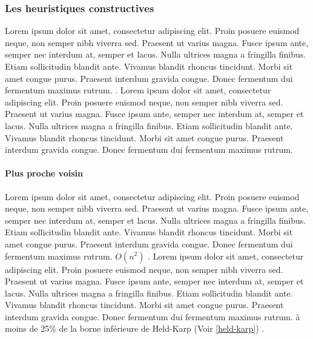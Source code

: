 \medskip

\subsubsection{Les heuristiques constructives}
Lorem ipsum dolor sit amet, consectetur adipiscing elit. Proin posuere euismod neque, non semper nibh viverra sed. Praesent ut varius magna. Fusce ipsum ante, semper nec interdum at, semper et lacus. Nulla ultrices magna a fringilla finibus. Etiam sollicitudin blandit ante. Vivamus blandit rhoncus tincidunt. Morbi sit amet congue purus. Praesent interdum gravida congue. Donec fermentum dui fermentum maximus rutrum. \parencite{anbuudayasankar_survey_2014}. Lorem ipsum dolor sit amet, consectetur adipiscing elit. Proin posuere euismod neque, non semper nibh viverra sed. Praesent ut varius magna. Fusce ipsum ante, semper nec interdum at, semper et lacus. Nulla ultrices magna a fringilla finibus. Etiam sollicitudin blandit ante. Vivamus blandit rhoncus tincidunt. Morbi sit amet congue purus. Praesent interdum gravida congue. Donec fermentum dui fermentum maximus rutrum.
\medskip

\paragraph{Plus proche voisin}
\label{par:nn}
Lorem ipsum dolor sit amet, consectetur adipiscing elit. Proin posuere euismod neque, non semper nibh viverra sed. Praesent ut varius magna. Fusce ipsum ante, semper nec interdum at, semper et lacus. Nulla ultrices magna a fringilla finibus. Etiam sollicitudin blandit ante. Vivamus blandit rhoncus tincidunt. Morbi sit amet congue purus. Praesent interdum gravida congue. Donec fermentum dui fermentum maximus rutrum. $O(n^2)$ \parencite{rosenkrantz_analysis_1977}.
Lorem ipsum dolor sit amet, consectetur adipiscing elit. Proin posuere euismod neque, non semper nibh viverra sed. Praesent ut varius magna. Fusce ipsum ante, semper nec interdum at, semper et lacus. Nulla ultrices magna a fringilla finibus. Etiam sollicitudin blandit ante. Vivamus blandit rhoncus tincidunt. Morbi sit amet congue purus. Praesent interdum gravida congue. Donec fermentum dui fermentum maximus rutrum. à moins de 25\% de la borne inférieure de Held-Karp (Voir \ref{held-karp}) \parencite{johnson_table_1995}.

\medskip

